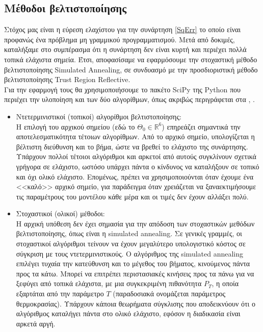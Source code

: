 \documentclass[12pt,a4paper,twoside,openany]{book}
\begin{document}
 \subsection{Μέθοδοι βελτιστοποίησης}
 	Στόχος μας είναι η εύρεση ελαχίστου για την συνάρτηση \eqref{SqErr} το οποίο είναι προφανώς ένα πρόβλημα μη γραμμικού προγραμματισμού. Μετά από δοκιμές, καταλήξαμε στο συμπέρασμα ότι η συνάρτηση δεν είναι κυρτή και περιέχει πολλά τοπικά ελάχιστα σημεία. Έτσι, αποφασίσαμε να εφαρμόσουμε την στοχαστική μέθοδο βελτιστοποίησης Simulated Annealing\cite{SA 1}, \cite{SA 2} σε συνδυασμό με την  προσδιοριστική μέθοδο βελτιστοποίησης Trust Region Reflective\cite{Method:Trust Region Reflective}.
 	\vspace{2.5mm}\\
 	Για την εφαρμογή τους θα χρησιμοποιήσουμε το πακέτο SciPy της Python που περιέχει την υλοποίηση και των δύο αλγορίθμων, όπως ακριβώς περιγράφεται στα \cite{Method:Trust Region Reflective}, \cite{SA 1}.
 	\begin{itemize}
 		\item Ντετερμινιστικοί (τοπικοί) αλγορίθμοι βελτιστοποίησης:\\
 			Η επιλογή του αρχικού σημείου (εδώ το $\Theta_0\in\mathbb{R}^6$) επηρεάζει σημαντικά την αποτελεσματικότητα τέτοιων αλγορίθμων. Από το αρχικό σημείο, υπολογίζεται η βέλτιστη διεύθυνση και το βήμα, ώστε να βρεθεί το ελάχιστο της συνάρτησης. Υπάρχουν πολλοί τέτοιοι αλγόριθμοι και αρκετοί από αυτούς συγκλίνουν σχετικά γρήγορα σε ελάχιστο, ωστόσο υπάρχει πάντα ο κίνδυνος να καταλήξουν σε τοπικό και όχι ολικό ελάχιστο. Επομένως, πρέπει να χρησιμοποιούνται όταν έχουμε ένα <<καλό>> αρχικό σημείο, για παράδειγμα όταν χρειάζεται να ξαναεκτιμήσουμε τις παραμέτρους του μοντέλου κάθε μέρα και οι τιμές δεν έχουν αλλάξει πολύ. 
 		\item Στοχαστικοί (ολικοί) μέθοδοι: \\
 			Η αρχική υπόθεση δεν έχει σημασία για την απόδοση των στοχαστικών μεθόδων βελτιστοποίησης, όπως είναι η simulated annealing. Σε γενικές γραμμές, οι στοχαστικοί αλγόριθμοι τείνουν να έχουν μεγαλύτερο υπολογιστικό κόστος σε σύγκριση με τους ντετερμινιστικούς. Ο αλγόριθμος της simulated annealing επιλέγει τυχαία την κατεύθυνση και το μέγεθος του βήματος, κινούμενος πάντα προς τα κάτω. Μπορεί να επιτρέπει περιστασιακές κινήσεις προς τα πάνω για να ξεφύγει από τοπικά ελάχιστα, με μια συγκεκριμένη πιθανότητα $P_T$, η οποία εξαρτάται από την παράμετρο $T$ (παραδοσιακά ονομάζεται παράμετρος θερμοκρασίας). Υπάρχουν κάποια θεωρήματα σύγκλισης που αποδεικνύουν ότι ο αλγόριθμος καταλήγει πάντα στο ολικό ελάχιστο, εφόσον η διαδικασία είναι αρκετά αργή.
 	\end{itemize}
\end{document}
